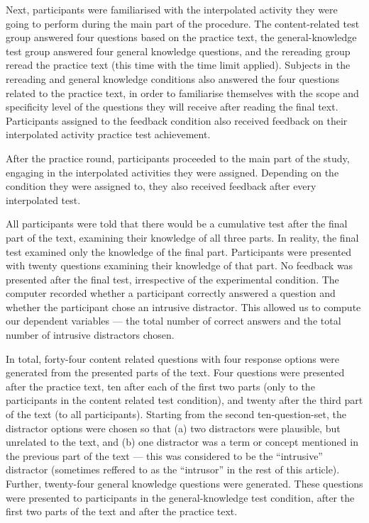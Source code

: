\documentclass[../main.tex]{subfiles}
\begin{document}
Next, participants were familiarised with the interpolated activity they
were going to perform during the main part of the procedure. The
content-related test group answered four questions based on the practice
text, the general-knowledge test group answered four general knowledge
questions, and the rereading group reread the practice text (this time
with the time limit applied). Subjects in the rereading and general
knowledge conditions also answered the four questions related to the
practice text, in order to familiarise themselves with the scope and
specificity level of the questions they will receive after reading the
final text. Participants assigned to the feedback condition also
received feedback on their interpolated activity practice test
achievement.

After the practice round, participants proceeded to the main part of the
study, engaging in the interpolated activities they were assigned.
Depending on the condition they were assigned to, they also received
feedback after every interpolated test.

All participants were told that there would be a cumulative test after
the final part of the text, examining their knowledge of all three
parts. In reality, the final test examined only the knowledge of the
final part. Participants were presented with twenty questions examining
their knowledge of that part. No feedback was presented after the final
test, irrespective of the experimental condition. The computer recorded
whether a participant correctly answered a question and whether the
participant chose an intrusive distractor. This allowed us to compute
our dependent variables --- the total number of correct answers and the
total number of intrusive distractors chosen.

In total, forty-four content related questions with four response
options were generated from the presented parts of the text. Four
questions were presented after the practice text, ten after each of the
first two parts (only to the participants in the content related test
condition), and twenty after the third part of the text (to all
participants). Starting from the second ten-question-set, the distractor
options were chosen so that (a) two distractors were plausible, but
unrelated to the text, and (b) one distractor was a term or concept
mentioned in the previous part of the text --- this was considered to be
the ``intrusive'' distractor (sometimes reffered to as the ``intrusor''
in the rest of this article). Further, twenty-four general knowledge
questions were generated. These questions were presented to participants
in the general-knowledge test condition, after the first two parts of
the text and after the practice text.
\end{document}
